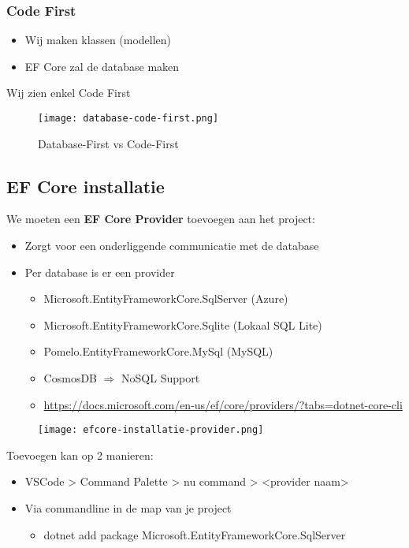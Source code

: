 \documentclass{article}
\begin{document}
\subsubsection{Code First}

\begin{itemize}
    \item Wij maken klassen (modellen)
    \item EF Core zal de database maken
\end{itemize}

Wij zien enkel Code First

\begin{figure}[H]
    \centering
    \texttt{[image: database-code-first.png]}
    \caption{Database-First vs Code-First}
\end{figure}

\subsection{EF Core installatie}

We moeten een \textbf{EF Core Provider} toevoegen aan het project:

\begin{itemize}
    \item Zorgt voor een onderliggende communicatie met de database
    \item Per database is er een provider
    \begin{itemize}
        \item Microsoft.EntityFrameworkCore.SqlServer (Azure)
        \item Microsoft.EntityFrameworkCore.Sqlite (Lokaal SQL Lite)
        \item Pomelo.EntityFrameworkCore.MySql (MySQL)
        \item CosmosDB $\Rightarrow$ NoSQL Support
        \item \url{https://docs.microsoft.com/en-us/ef/core/providers/?tabs=dotnet-core-cli}
    \end{itemize}
\end{itemize}

\begin{figure}[H]
    \centering
    \texttt{[image: efcore-installatie-provider.png]}
    \caption{}
\end{figure}

Toevoegen kan op 2 manieren:

\begin{itemize}
    \item VSCode > Command Palette > nu command > <provider naam>
    \item Via commandline in de map van je project
    \begin{itemize}
        \item dotnet add package Microsoft.EntityFrameworkCore.SqlServer
    \end{itemize}
\end{itemize}
\end{document}
